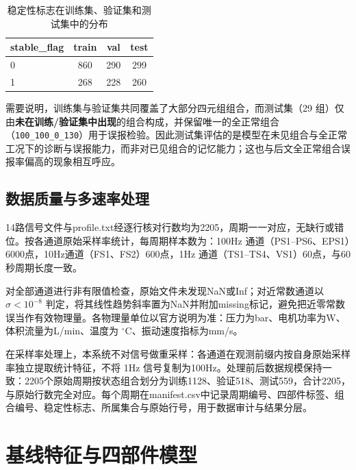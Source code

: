 \documentclass[12pt, a4paper]{ctexart}
\begin{document}
\begin{table}[H]
    \centering
    \caption{稳定性标志在训练集、验证集和测试集中的分布}
    \label{tab:stable_flag_dist}
    \begin{tabular}{lccc}
        \toprule
        \textbf{stable\_flag} & \textbf{train} & \textbf{val} & \textbf{test} \\
        \midrule
        0                     & 860            & 290          & 299           \\
        1                     & 268            & 228          & 260           \\
        \bottomrule
    \end{tabular}
\end{table}

需要说明，训练集与验证集共同覆盖了大部分四元组组合，而测试集（29 组）仅由\textbf{未在训练/验证集中出现}的组合构成，并保留唯一的全正常组合（\texttt{100\_100\_0\_130}）用于误报检验。因此测试集评估的是模型在未见组合与全正常工况下的诊断与误报能力，而非对已见组合的记忆能力；这也与后文全正常组合误报率偏高的现象相互呼应。

\subsection{数据质量与多速率处理}
14路信号文件与profile.txt经逐行核对行数均为2205，周期一一对应，无缺行或错位。按各通道原始采样率统计，每周期样本数为：100Hz 通道（PS1--PS6、EPS1）6000点，10Hz通道（FS1、FS2）600点，1Hz 通道（TS1--TS4、VS1）60点，与60秒周期长度一致。

对全部通道进行非有限值检查，原始文件未发现NaN或Inf；对近常数通道以 $\sigma < 10^{-8}$ 判定，将其线性趋势斜率置为NaN并附加missing标记，避免把近零常数误当作有效物理量。各物理量单位以官方说明为准：压力为bar、电机功率为W、体积流量为L/min、温度为 $^\circ$C、振动速度指标为mm/s。

在采样率处理上，本系统不对信号做重采样：各通道在观测前缀内按自身原始采样率独立提取统计特征，不将 1Hz 信号复制为100Hz。处理前后数据规模保持一致：2205个原始周期按状态组合划分为训练1128、验证518、测试559，合计2205，与原始行数完全对应。每个周期在manifest.csv中记录周期编号、四部件标签、组合编号、稳定性标志、所属集合与原始行号，用于数据审计与结果分层。

\section{基线特征与四部件模型}
\end{document}
